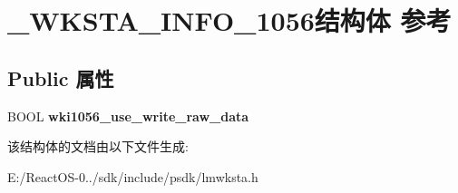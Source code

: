 \hypertarget{struct___w_k_s_t_a___i_n_f_o__1056}{}\section{\+\_\+\+W\+K\+S\+T\+A\+\_\+\+I\+N\+F\+O\+\_\+1056结构体 参考}
\label{struct___w_k_s_t_a___i_n_f_o__1056}
\subsection*{Public 属性}
\begin{DoxyCompactItemize}
\item 
\mbox{\label{struct___w_k_s_t_a___i_n_f_o__1056_a7b8b3cb7a327b6ef4d350e646d6f6f17}} 
B\+O\+OL {\bfseries wki1056\+\_\+use\+\_\+write\+\_\+raw\+\_\+data}
\end{DoxyCompactItemize}


该结构体的文档由以下文件生成\+:\begin{DoxyCompactItemize}
\item 
E\+:/\+React\+O\+S-\/0../sdk/include/psdk/lmwksta.\+h\end{DoxyCompactItemize}
